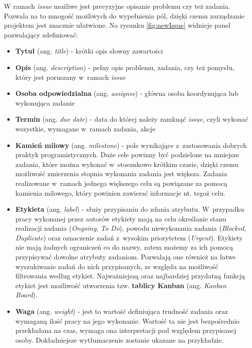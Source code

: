 W ramach \textit{issue} możliwe jest precyzyjne opisanie problemu czy też zadania. Pozwala na to mnogość możliwych do wypełnienia pól, dzięki czemu zarządzanie projektem jest znacznie ułatwione. Na rysunku \ref{fig:newIssue} widnieje panel pozwalający zdefiniować:
\begin{itemize}
\item \textbf{Tytuł} (ang. \textit{title}) - krótki opis słowny zawartości
\item \textbf{Opis} (ang. \textit{description}) - pełny opis problemu, zadania, czy też pomysłu, który jest poruszany w~ramach \textit{issue}
\item \textbf{Osoba odpowiedzialna} (ang. \textit{assignee}) - główna osoba koordynująca lub wykonująca zadanie
\item \textbf{Termin} (ang. \textit{due date}) - data do której należy zamknąć \textit{issue}, czyli wykonać wszystkie, wymagane w~ramach zadania, akcje
\item \textbf{Kamień milowy} (ang. \textit{milestone}) - pole wynikające z~zastosowania dobrych praktyk programistycznych. Duże cele powinny być podzielone na mniejsze zadania, które można wykonać w~stosunkowo krótkim czasie, dzięki czemu możliwość zmierzenia stopnia wykonania zadania jest większa. Zadania realizowane w~ramach jednego większego celu są powiązane za pomocą kamienia milowego, który powinien zawierać informacje nt. tegoż celu.
\item \textbf{Etykieta} (ang. \textit{label}) - służy przypisaniu do zdania atrybutu. W~przypadku pracy wykonanej przez autorów etykiety mają na celu określanie stanu realizacji zadania (\textit{Ongoing}, \textit{To Do}), powodu niewykonania zadania (\textit{Blocked}, \textit{Duplicate}) oraz oznaczenie zadań z~wysokim priorytetem (\textit{Urgent}). Etykiety nie mają żadnych ograniczeń co do nazwy, zatem możemy za ich pomocą przypisywać dowolne atrybuty zadaniom. Pozwalają one również na łatwe wyszukiwanie zadań do nich przypisanych, ze względu na możliwość filtrowania według etykiet. Najważniejszą oraz najbardziej przydatną funkcją etykiet jest możliwość utworzenia tzw. \textbf{tablicy Kanban} (ang. \textit{Kanban Board}).
\item \textbf{Waga} (ang. \textit{weight}) - jest to wartość definiująca trudność zadania oraz wymaganą ilość pracy na jego wykonanie. Wartość ta nie jest bezpośrednio przekładana na czas, wymaga ona interpretacji pod względem przypisanej osoby. Dokładniejsze wytłumaczenie zostanie ukazane na przykładzie.
\end{itemize}

